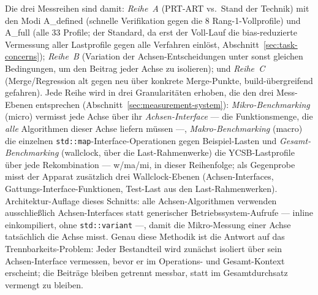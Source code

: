 \begin{nurkurz}
Die drei Messreihen sind damit: \emph{Reihe~A} (PRT-ART vs.\ Stand der Technik) mit den Modi A\_defined
(schnelle Verifikation gegen die 8 Rang-1-Vollprofile) und A\_full (alle 33 Profile; der Standard, da erst der
Voll-Lauf die bias-reduzierte Vermessung aller Lastprofile gegen alle Verfahren einlöst,
Abschnitt~\ref{sec:task-concerns}); \emph{Reihe~B} (Variation der Achsen-Entscheidungen unter sonst gleichen
Bedingungen, um den Beitrag jeder Achse zu isolieren); und \emph{Reihe~C} (Merge/Regression alt gegen neu über
konkrete Merge-Punkte, build-übergreifend gefahren). Jede Reihe wird in drei Granularitäten erhoben, die den
drei Mess-Ebenen entsprechen (Abschnitt~\ref{sec:measurement-system}): \emph{Mikro-Benchmarking} (micro)
vermisst jede Achse über ihr \emph{Achsen-Interface} --- die Funktionsmenge, die \emph{alle} Algorithmen dieser
Achse liefern müssen ---, \emph{Makro-Benchmarking} (macro) die einzelnen \texttt{std::map}-Interface-Operationen
gegen Beispiel-Lasten und \emph{Gesamt-Benchmarking} (wallclock, über die Last-Rahmenwerke) die YCSB-Lastprofile
über jede Rekombination --- w/ma/mi, in dieser Reihenfolge; als Gegenprobe misst der Apparat zusätzlich drei
Wallclock-Ebenen (Achsen-Interfaces, Gattungs-Interface-Funktionen, Test-Last aus den Last-Rahmenwerken).
Architektur-Auflage dieses Schnitts: alle Achsen-Algorithmen verwenden ausschließlich Achsen-Interfaces statt
generischer Betriebssystem-Aufrufe --- inline einkompiliert, ohne \texttt{std::variant} ---, damit die
Mikro-Messung einer Achse tatsächlich die Achse misst. Genau diese Methodik ist die Antwort auf das
Trennbarkeits-Problem: Jeder Bestandteil wird zunächst isoliert über sein Achsen-Interface vermessen, bevor er
im Operations- und Gesamt-Kontext erscheint; die Beiträge bleiben getrennt messbar, statt im Gesamtdurchsatz
vermengt zu bleiben.


\end{nurkurz}
